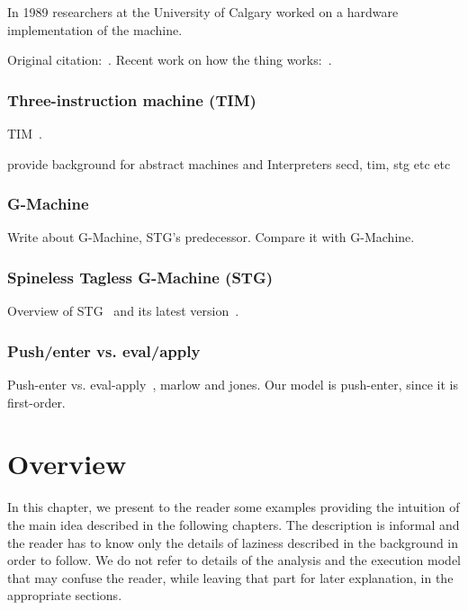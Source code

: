 \documentclass[diploma]{softlab-thesis}
\begin{document}
In 1989 researchers at the University of Calgary worked 
on a hardware implementation of the machine.

Original citation:~\cite{La64}. Recent work on how the thing works:~\cite{Danvy:2004:RDL:2154439.2154443}.

\subsection{Three-instruction machine (TIM)}
\label{sec:tim}

TIM~\cite{Argo89}.

provide background for abstract machines and Interpreters
secd, tim, stg etc etc

\subsection{G-Machine}
\label{sec:g-machine}
Write about G-Machine, STG's predecessor. Compare it with G-Machine.

\subsection{Spineless Tagless G-Machine (STG)}
\label{sec:stg}
Overview of STG~\cite{Jo92} and its latest version~\cite{Ma06}.

\subsection{Push/enter vs. eval/apply}
\label{sec:push-enter}
Push-enter vs. eval-apply~\cite{Ma06}, marlow and jones. Our model is push-enter, since it is first-order.






\chapter {Overview}
\label{ch:overview}

In this chapter, we present to the reader some examples providing the intuition of the main idea described 
in the following chapters. The description is informal and the reader has to know only the details of laziness 
described in the background in order to follow. We do not refer to details of the analysis and the execution model 
that may confuse the reader, while leaving that part for later explanation, in the appropriate sections.
\end{document}
